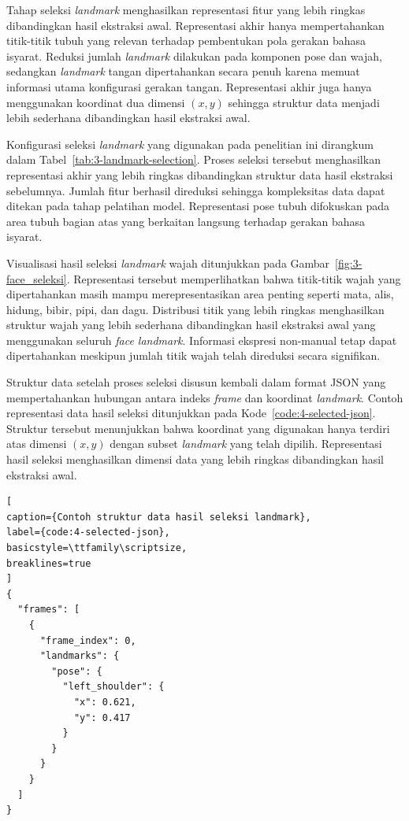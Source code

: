 Tahap seleksi \textit{landmark} menghasilkan representasi fitur yang lebih ringkas dibandingkan hasil ekstraksi awal. 
Representasi akhir hanya mempertahankan titik-titik tubuh yang relevan terhadap pembentukan pola gerakan bahasa isyarat. 
Reduksi jumlah \textit{landmark} dilakukan pada komponen pose dan wajah, sedangkan \textit{landmark} tangan dipertahankan secara penuh karena memuat informasi utama konfigurasi gerakan tangan. 
Representasi akhir juga hanya menggunakan koordinat dua dimensi $(x,y)$ sehingga struktur data menjadi lebih sederhana dibandingkan hasil ekstraksi awal.

Konfigurasi seleksi \textit{landmark} yang digunakan pada penelitian ini dirangkum dalam Tabel~\ref{tab:3-landmark-selection}. 
Proses seleksi tersebut menghasilkan representasi akhir yang lebih ringkas dibandingkan struktur data hasil ekstraksi sebelumnya. 
Jumlah fitur berhasil direduksi sehingga kompleksitas data dapat ditekan pada tahap pelatihan model. 
Representasi pose tubuh difokuskan pada area tubuh bagian atas yang berkaitan langsung terhadap gerakan bahasa isyarat.

Visualisasi hasil seleksi \textit{landmark} wajah ditunjukkan pada Gambar~\ref{fig:3-face_seleksi}. 
Representasi tersebut memperlihatkan bahwa titik-titik wajah yang dipertahankan masih mampu merepresentasikan area penting seperti mata, alis, hidung, bibir, pipi, dan dagu. 
Distribusi titik yang lebih ringkas menghasilkan struktur wajah yang lebih sederhana dibandingkan hasil ekstraksi awal yang menggunakan seluruh \textit{face landmark}. 
Informasi ekspresi non-manual tetap dapat dipertahankan meskipun jumlah titik wajah telah direduksi secara signifikan.

Struktur data setelah proses seleksi disusun kembali dalam format JSON yang mempertahankan hubungan antara indeks \textit{frame} dan koordinat \textit{landmark}. 
Contoh representasi data hasil seleksi ditunjukkan pada Kode~\ref{code:4-selected-json}. 
Struktur tersebut menunjukkan bahwa koordinat yang digunakan hanya terdiri atas dimensi $(x,y)$ dengan subset \textit{landmark} yang telah dipilih. 
Representasi hasil seleksi menghasilkan dimensi data yang lebih ringkas dibandingkan hasil ekstraksi awal.

\begin{lstlisting}[
caption={Contoh struktur data hasil seleksi landmark},
label={code:4-selected-json},
basicstyle=\ttfamily\scriptsize,
breaklines=true
]
{
  "frames": [
    {
      "frame_index": 0,
      "landmarks": {
        "pose": {
          "left_shoulder": {
            "x": 0.621,
            "y": 0.417
          }
        }
      }
    }
  ]
}
\end{lstlisting}

